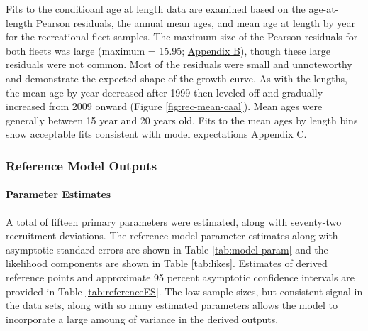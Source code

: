 \documentclass[11pt,
  english,
  a4paper,
]{article}
\begin{document}

Fits to the conditioanl age at length data are examined based on the age-at-length Pearson residuals, the annual mean ages, and mean age at length by year for the recreational fleet samples. The maximum size of the Pearson residuals for both fleets was large (maximum = 15.95; {\protect\hyperlink{app_b}{Appendix B}\leavevmode\tagmcend\tagstructend}), though these large residuals were not common. Most of the residuals were small and unnoteworthy and demonstrate the expected shape of the growth curve. As with the lengths, the mean age by year decreased after 1999 then leveled off and gradually increased from 2009 onward (Figure \ref{fig:rec-mean-caal}). Mean ages were generally between 15 year and 20 years old. Fits to the mean ages by length bins show acceptable fits consistent with model expectations {\protect\hyperlink{app_c}{Appendix C}\leavevmode\tagmcend\tagstructend}.

\leavevmode\tagmcend\tagstructend\par


\hypertarget{reference-model-outputs}{%
\subsubsection{Reference Model Outputs}\label{reference-model-outputs}}

\leavevmode\tagmcend\tagstructend


\hypertarget{parameter-estimates}{%
\paragraph{Parameter Estimates}\label{parameter-estimates}}

\leavevmode\tagmcend\tagstructend


A total of fifteen primary parameters were estimated, along with seventy-two recruitment deviations. The reference model parameter estimates along with asymptotic standard errors are shown in Table \ref{tab:model-param} and the likelihood components are shown in Table \ref{tab:likes}. Estimates of derived reference points and approximate 95 percent asymptotic confidence intervals are provided in Table \ref{tab:referenceES}. The low sample sizes, but consistent signal in the data sets, along with so many estimated parameters allows the model to incorporate a large amoung of variance in the derived outputs.
\end{document}
